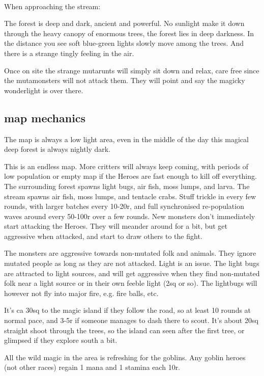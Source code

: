 \

\noindent When approaching the stream:
\begin{readoutloud}
The forest is deep and dark, ancient and powerful. No sunlight make it down through the heavy canopy of enormous trees, the forest lies in deep darkness. In the distance you see soft blue-green lights slowly move among the trees. And there is a strange tingly feeling in the air.
\end{readoutloud}

\noindent Once on site the strange mutarunts will simply sit down and relax, care free since the mutamonsters will not attack them. They will point and say the magicky wonderlight is over there.


\subsection*{map mechanics}
The map is always a low light area, even in the middle of the day this magical deep forest is always nightly dark.

This is an endless map. More critters will always keep coming, with periods of low population or empty map if the Heroes are fast enough to kill off everything. The surrounding forest spawns light bugs, air fish, moss lumps, and larva. The stream spawns air fish, moss lumps, and tentacle crabs. Stuff trickle in every few rounds, with larger batches every 10-20r, and full synchronised re-population waves around every 50-100r over a few rounds. New monsters don't immediately start attacking the Heroes. They will meander around for a bit, but get aggressive when attacked, and start to draw others to the fight.

The monsters are aggressive towards non-mutated folk and animals. They ignore mutated people as long as they are not attacked.
Light is an issue. The light bugs are attracted to light sources, and will get aggressive when they find non-mutated folk near a light source or in their own feeble light (2sq or so). The lightbugs will however not fly into major fire, e.g. fire balls, etc.

It's ca 30sq to the magic island if they follow the road, so at least 10 rounds at normal pace, and 3-5r if someone manages to dash there to scout. It's about 20sq straight shoot through the trees, so the island can seen after the first tree, or glimpsed if they explore south a bit.

All the wild magic in the area is refreshing for the goblins. Any goblin heroes (not other races) regain 1 mana and 1 stamina each 10r.

